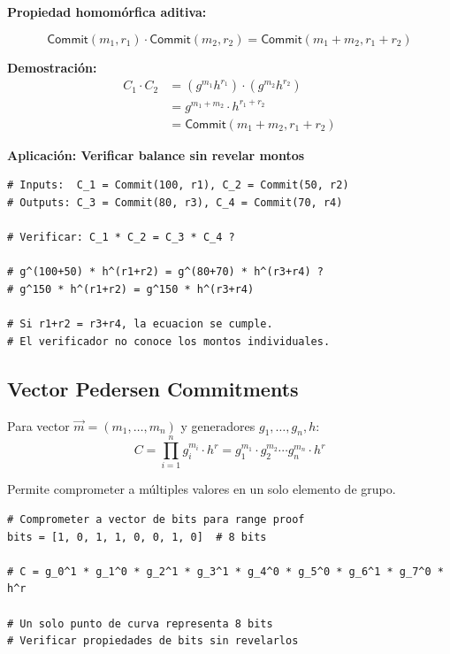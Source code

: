 \documentclass[11pt,a4paper,twoside]{book}
\newcommand{\Commit}{\textsf{Commit}}
\begin{document}
\begin{keyidea}
\textbf{Propiedad homom\'orfica aditiva:}

\[ \Commit(m_1, r_1) \cdot \Commit(m_2, r_2) = \Commit(m_1 + m_2, r_1 + r_2) \]

\textbf{Demostraci\'on:}
\begin{align*}
C_1 \cdot C_2 &= (g^{m_1} h^{r_1}) \cdot (g^{m_2} h^{r_2}) \\
&= g^{m_1 + m_2} \cdot h^{r_1 + r_2} \\
&= \Commit(m_1 + m_2, r_1 + r_2)
\end{align*}

\textbf{Aplicaci\'on: Verificar balance sin revelar montos}

\begin{lstlisting}[style=python]
# Inputs:  C_1 = Commit(100, r1), C_2 = Commit(50, r2)
# Outputs: C_3 = Commit(80, r3), C_4 = Commit(70, r4)

# Verificar: C_1 * C_2 = C_3 * C_4 ?

# g^(100+50) * h^(r1+r2) = g^(80+70) * h^(r3+r4) ?
# g^150 * h^(r1+r2) = g^150 * h^(r3+r4)

# Si r1+r2 = r3+r4, la ecuacion se cumple.
# El verificador no conoce los montos individuales.
\end{lstlisting}
\end{keyidea}

\subsection{Vector Pedersen Commitments}

\begin{definition}
Para vector $\vec{m} = (m_1, \ldots, m_n)$ y generadores $g_1, \ldots, g_n, h$:
\[ C = \prod_{i=1}^{n} g_i^{m_i} \cdot h^r = g_1^{m_1} \cdot g_2^{m_2} \cdots g_n^{m_n} \cdot h^r \]

Permite comprometer a m\'ultiples valores en un solo elemento de grupo.
\end{definition}

\begin{example}
\begin{lstlisting}[style=python]
# Comprometer a vector de bits para range proof
bits = [1, 0, 1, 1, 0, 0, 1, 0]  # 8 bits

# C = g_0^1 * g_1^0 * g_2^1 * g_3^1 * g_4^0 * g_5^0 * g_6^1 * g_7^0 * h^r

# Un solo punto de curva representa 8 bits
# Verificar propiedades de bits sin revelarlos
\end{lstlisting}
\end{example}
\end{document}
